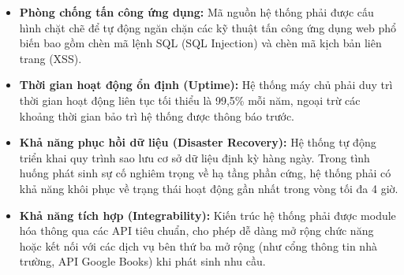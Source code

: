 \begin{itemize}
    \item \textbf{Phòng chống tấn công ứng dụng:} Mã nguồn hệ thống phải được cấu hình chặt chẽ để tự động ngăn chặn các kỹ thuật tấn công ứng dụng web phổ biến bao gồm chèn mã lệnh SQL (SQL Injection) và chèn mã kịch bản liên trang (XSS).
    
    \item \textbf{Thời gian hoạt động ổn định (Uptime):} Hệ thống máy chủ phải duy trì thời gian hoạt động liên tục tối thiểu là 99,5\% mỗi năm, ngoại trừ các khoảng thời gian bảo trì hệ thống được thông báo trước.
    
    \item \textbf{Khả năng phục hồi dữ liệu (Disaster Recovery):} Hệ thống tự động triển khai quy trình sao lưu cơ sở dữ liệu định kỳ hàng ngày. Trong tình huống phát sinh sự cố nghiêm trọng về hạ tầng phần cứng, hệ thống phải có khả năng khôi phục về trạng thái hoạt động gần nhất trong vòng tối đa 4 giờ.
    
    \item \textbf{Khả năng tích hợp (Integrability):} Kiến trúc hệ thống phải được module hóa thông qua các API tiêu chuẩn, cho phép dễ dàng mở rộng chức năng hoặc kết nối với các dịch vụ bên thứ ba mở rộng (như cổng thông tin nhà trường, API Google Books) khi phát sinh nhu cầu.
\end{itemize}


